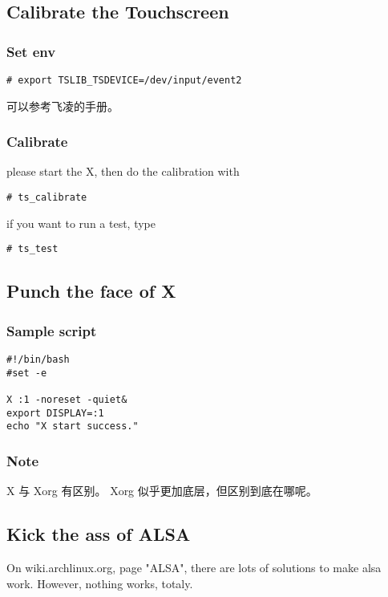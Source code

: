 \documentclass[11pt,a4paper]{article}
\begin{document}
\begin{CJK}{UTF8}{gbsn}
\subsection{Calibrate the Touchscreen}
\subsubsection{Set env}
\begin{verbatim}
# export TSLIB_TSDEVICE=/dev/input/event2
\end{verbatim}
可以参考飞凌的手册。
\subsubsection{Calibrate}
please start the X, then do the calibration with
\begin{verbatim}
# ts_calibrate
\end{verbatim}
if you want to run a test, type
\begin{verbatim}
# ts_test
\end{verbatim}

\subsection{Punch the face of X}
\subsubsection{Sample script}
\begin{verbatim}
#!/bin/bash                                                                     
#set -e                                                                         

X :1 -noreset -quiet&                                                           
export DISPLAY=:1                                                               
echo "X start success."      
\end{verbatim}
\subsubsection{Note}
X 与 Xorg 有区别。\newline
Xorg 似乎更加底层，但区别到底在哪呢。

\subsection{Kick the ass of ALSA}
On wiki.archlinux.org, page "ALSA", there are lots of solutions to
make alsa work.\newline
However, nothing works, totaly.

\end{CJK}
\end{document}
